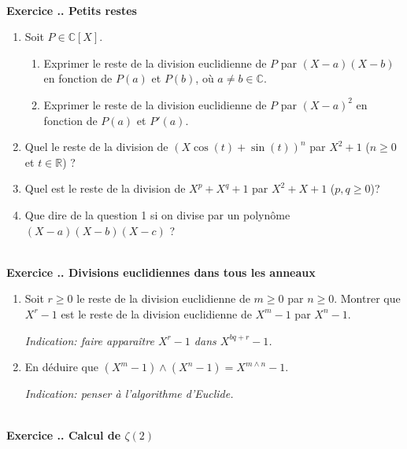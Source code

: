 \documentclass{article}
\newcommand{\mb}[1]{\mathbb{#1}}
\newcounter{exo}
\newcommand{\exercice}[1][\null]{\textbf{\\ Exercice \thesection.\theexo. #1} \addtocounter{exo}{1}}
\begin{document}
\exercice[Petits restes]

\begin{enumerate}

\item Soit $P \in \mb{C}[X]$.

\begin{enumerate}

\item Exprimer le reste de la division euclidienne de $P$ par $(X-a)(X-b)$ en fonction de $P(a)$ et $P(b)$, où $a \neq b \in \mb{C}$. 

\item Exprimer le reste de la division euclidienne de $P$ par $(X-a)^2$ en fonction de $P(a)$ et $P'(a)$. 

\end{enumerate}

\item Quel le reste de la division de $(X \cos(t) + \sin(t))^n$ par $X^2+1$ ($n \ge 0$ et $t \in \mb{R}$) ?

\item Quel est le reste de la division de $X^p + X^q + 1$ par $X^2 + X + 1$ ($p,q \ge 0$)?

\item Que dire de la question 1 si on divise par un polynôme $(X-a)(X-b)(X-c)$ ?

\end{enumerate}






\exercice[Divisions euclidiennes dans tous les anneaux]

\begin{enumerate}

\item Soit $r \ge 0$ le reste de la division euclidienne de $m\ge 0$ par $n \ge 0$. Montrer que $X^r-1$ est le reste de la division euclidienne de $X^m -1$ par $X^n -1$.

\emph{Indication: faire apparaître $X^r-1$ dans $X^{bq+r}-1$.}

\item En déduire que $(X^m -1) \wedge (X^n -1) = X^{m \wedge n}-1$.

\emph{Indication: penser à l'algorithme d'Euclide.}

\end{enumerate}

\exercice[Calcul de $\zeta(2)$]
\end{document}
